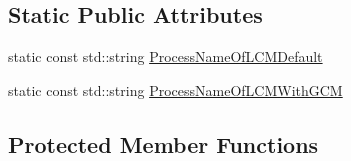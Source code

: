 \subsection*{Static Public Attributes}
\begin{DoxyCompactItemize}
\item 
static const std\-::string \hyperlink{classmts_manager_local_af1eb58312e2aae8668b7cdc00b211c31}{Process\-Name\-Of\-L\-C\-M\-Default}
\item 
static const std\-::string \hyperlink{classmts_manager_local_a4210fa8488468453764d5788f6c041a2}{Process\-Name\-Of\-L\-C\-M\-With\-G\-C\-M}
\end{DoxyCompactItemize}
\subsection*{Protected Member Functions}
